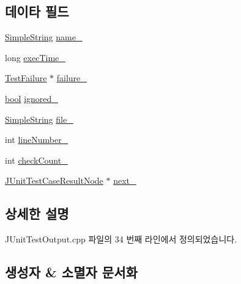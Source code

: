 \subsection*{데이타 필드}
\begin{DoxyCompactItemize}
\item 
\hyperlink{class_simple_string}{Simple\+String} \hyperlink{struct_j_unit_test_case_result_node_aac73c86e1e892f392d1fc423e25f51a8}{name\+\_\+}
\item 
long \hyperlink{struct_j_unit_test_case_result_node_a6f640faf8b55069c9ec6da509fe7a534}{exec\+Time\+\_\+}
\item 
\hyperlink{class_test_failure}{Test\+Failure} $\ast$ \hyperlink{struct_j_unit_test_case_result_node_ac7f55ae41ae75d276535c60abc3d7563}{failure\+\_\+}
\item 
\hyperlink{avb__gptp_8h_af6a258d8f3ee5206d682d799316314b1}{bool} \hyperlink{struct_j_unit_test_case_result_node_a080bf1251153ebc55b9b430fd869e147}{ignored\+\_\+}
\item 
\hyperlink{class_simple_string}{Simple\+String} \hyperlink{struct_j_unit_test_case_result_node_a8039b5fa783b1cde83ede18ddd9ada38}{file\+\_\+}
\item 
int \hyperlink{struct_j_unit_test_case_result_node_ab83f5a7389dae9b8045aa6fbf55b153a}{line\+Number\+\_\+}
\item 
int \hyperlink{struct_j_unit_test_case_result_node_a50ee7523f38c3e4845847d4f155c09f8}{check\+Count\+\_\+}
\item 
\hyperlink{struct_j_unit_test_case_result_node}{J\+Unit\+Test\+Case\+Result\+Node} $\ast$ \hyperlink{struct_j_unit_test_case_result_node_a071cdad5d255e499920e0f7fb745f94a}{next\+\_\+}
\end{DoxyCompactItemize}


\subsection{상세한 설명}


J\+Unit\+Test\+Output.\+cpp 파일의 34 번째 라인에서 정의되었습니다.



\subsection{생성자 \& 소멸자 문서화}
